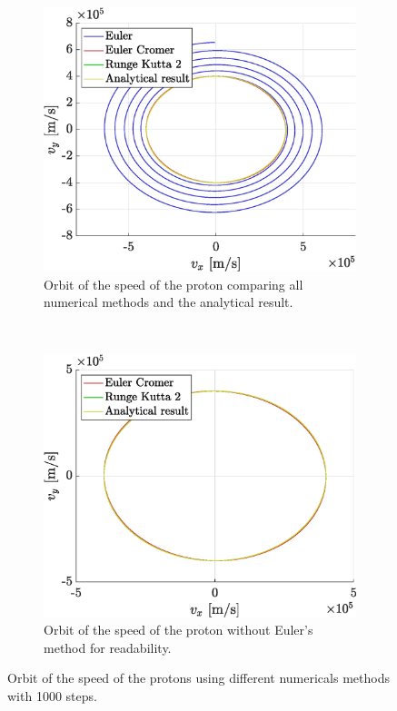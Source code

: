 \documentclass[a4paper,12pt,twoside]{article}
\begin{document}
\begin{figure}[h]
	\centering
	\begin{subfigure}[t]{0.45\textwidth}
	\includegraphics[width=\linewidth]{graphs/ex2_iii_speed_ALL.eps}
		\caption{Orbit of the speed of the proton comparing all numerical methods and the analytical result.}
		\label{fig:ex2-iii-speed-ALL}
	\end{subfigure}
	~
	\begin{subfigure}[t]{0.45\textwidth}
		\includegraphics[width=\linewidth]{graphs/ex2_iii_speed_NoEuler.eps}
		\caption{Orbit of the speed of the proton without Euler's method for readability.}
		\label{fig:ex2-iii-speed-NoEuler}
	\end{subfigure}

	\caption{Orbit of the speed of the protons using different numericals methods with \num{1000} steps.} %
	\label{fig:ex2-iii-speed}
\end{figure}
\end{document}
